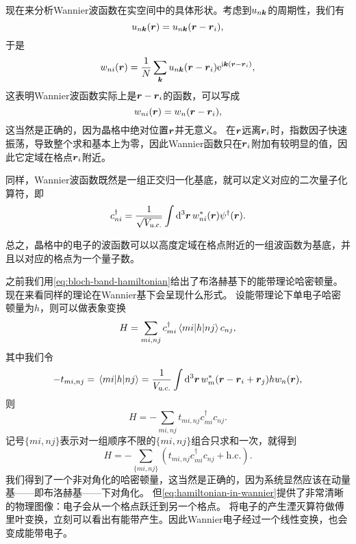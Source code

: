 现在来分析Wannier波函数在实空间中的具体形状。考虑到$u_{n\vb*{k}}$的周期性，我们有
\[
    u_{n\vb*{k}} (\vb*{r}) = u_{n\vb*{k}} (\vb*{r} - \vb*{r}_i),
\]
于是
\begin{equation}
    w_{ni}(\vb*{r}) = \frac{1}{N} \sum_{\vb*{k}} u_{n\vb*{k}} (\vb*{r} - \vb*{r}_i) \mathrm{e}^{\mathrm{i} \vb*{k} (\vb*{r} - \vb*{r}_i)},
\end{equation}
这表明Wannier波函数实际上是$\vb*{r} - \vb*{r}_i$的函数，可以写成
\begin{equation}
    w_{ni}(\vb*{r}) = w_{n}(\vb*{r} - \vb*{r}_i),
\end{equation}
这当然是正确的，因为晶格中绝对位置$\vb*{r}$并无意义。
在$\vb*{r}$远离$\vb*{r}_i$时，指数因子快速振荡，导致整个求和基本上为零，因此Wannier函数只在$\vb*{r}_i$附加有较明显的值，因此它定域在格点$\vb*{r}_i$附近。

同样，Wannier波函数既然是一组正交归一化基底，就可以定义对应的二次量子化算符，即
\begin{equation}
    {c}^\dagger_{ni} = \frac{1}{\sqrt{V_\text{u.c.}}} \int \dd[3]{\vb*{r}} w_{ni}^*(\vb*{r}) {\psi}^\dagger(\vb*{r}).
\end{equation}

总之，晶格中的电子的波函数可以以高度定域在格点附近的一组波函数为基底，并且以对应的格点为一个量子数。

之前我们用\eqref{eq:bloch-band-hamiltonian}给出了布洛赫基下的能带理论哈密顿量。现在来看同样的理论在Wannier基下会呈现什么形式。
设能带理论下单电子哈密顿量为${h}$，则可以做表象变换
\[
    {H} = \sum_{mi, nj} {c}^\dagger_{mi} \mel{mi}{{h}}{nj} {c}_{nj},
\]
其中我们令
\begin{equation}
    - t_{mi, nj} = \mel{mi}{{h}}{nj} = \frac{1}{V_\text{u.c.}} \int \dd[3]{\vb*{r}} w_m^*(\vb*{r} - \vb*{r}_i + \vb*{r}_j) {h} w_n(\vb*{r}),
\end{equation}
则
\[
    {H} = - \sum_{mi, nj} t_{mi, nj} {c}^\dagger_{mi} {c}_{nj}.
\]
记号$\{mi, nj\}$表示对一组顺序不限的$\{mi, nj\}$组合只求和一次，就得到
\begin{equation}
    {H} = - \sum_{\{mi, nj\}} (t_{mi, nj} {c}_{mi}^\dagger {c}_{nj} + \text{h.c.}).
    \label{eq:hamiltonian-in-wannier}
\end{equation}
我们得到了一个非对角化的哈密顿量，这当然是正确的，因为系统显然应该在动量基——即布洛赫基——下对角化。
但\eqref{eq:hamiltonian-in-wannier}提供了非常清晰的物理图像：电子会从一个格点跃迁到另一个格点。
将电子的产生湮灭算符做傅里叶变换，立刻可以看出有能带产生。因此Wannier电子经过一个线性变换，也会变成能带电子。

